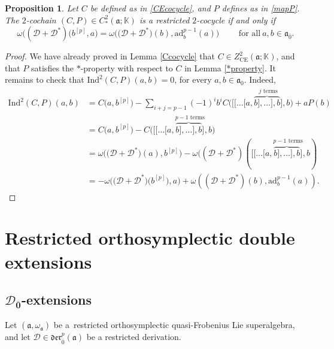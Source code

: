 \documentclass[10pt,a4paper]{amsart}
\numberwithin{equation}{section}
\newtheorem{Proposition}[Theorem]{Proposition}
 { \theoremstyle{definition}
\newtheorem{Definition}[Theorem]{Definition}
\newtheorem{Note}[Theorem]{Note}
\newtheorem{Example}[Theorem]{Example}
\newtheorem{Remark}[Theorem]{Remark} }
\begin{document}
\begin{Proposition}\label{CP2cocycle}
Let $C$ be defined as in \eqref{CEcocycle}, and $P$ defines as in \eqref{mapP}. The $2$-cochain $(C,P)\in C^2_*(\mathfrak{a};\mathbb{K})$ is a restricted $2$-cocycle if and only if
\[
\omega(({\mathscr D}+{\mathscr D}^*)\bigl(b^{[p]}, a\bigr) = \omega\bigl(\bigl({\mathscr D}+{\mathscr D}^*\bigr)(b), \mathrm{ad}_b^{p-1}(a)\bigr)\qquad \text{ for all}\ a,b\in \mathfrak{a}_{\bar 0}.
\]
\end{Proposition}

\begin{proof}
We have already proved in Lemma \ref{Ccocycle} that $C\in Z^2_{\mathrm{CE}}(\mathfrak{a}; \mathbb{K})$, and that $P$ satisfies the $*$-property with respect to $C$ in Lemma \ref{*property}. It remains to check that $\mathrm{Ind}^2(C,P)(a,b)=0$, for every $a,b\in\mathfrak{a}_0.$ Indeed,
\begin{align*}
 \mathrm{Ind}^2(C,P)(a,b)&=C\bigl( a,b^{[p]}\bigr) - \sum_{i+j=p-1}(-1)^ib^i C\bigl( [[\dots [a,\overset{j\text{ terms}}{\overbrace{b],\dots ],b}]},b\bigr)+aP(b)\\
 &=C\bigl(a,b^{[p]}\bigr)-C\bigl([[\dots [a,\overset{p-1\text{ terms}}{\overbrace{b],\dots ],b}]},b\bigr)\\
 &=\omega\bigl(\bigl({\mathscr D}+{\mathscr D}^*\bigr)(a),b^{[p]}\bigr)-\omega(({\mathscr D}+{\mathscr D}^*)([[\dots [a,\overset{p-1\text{ terms}}{\overbrace{b],\dots ],b}]},b)\\
 &=-\omega\bigl(\bigl({\mathscr D}+{\mathscr D}^*\bigr)\bigl(b^{[p]}\bigr),a\bigr)+\omega(({\mathscr D}+{\mathscr D}^*)(b),\mathrm{ad}_b^{p-1}(a)).\tag*{\qed}
\end{align*}
\renewcommand{\qed}{}
\end{proof}
\section{Restricted orthosymplectic double extensions}\label{results}
 \subsection[D\_0 -extensions]{$\boldsymbol{{\mathscr D}_{\bar 0}}$-extensions}\label{D0omega0}

Let $(\mathfrak{a}, \omega_\mathfrak{a})$ be a~restricted orthosymplectic quasi-Frobenius Lie superalgebra, and let ${\mathscr D}\in \mathfrak{der}_{\bar 0}^p
(\mathfrak{a})$ be a restricted derivation.
\end{document}
